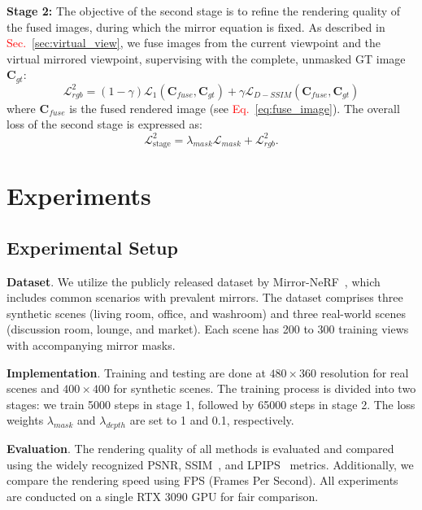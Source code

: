 \documentclass[conference]{IEEEtran}
\begin{document}
\textbf{Stage 2:} The objective of the second stage is to refine the rendering quality of the fused images, during which the mirror equation is fixed. As described in \textcolor{red}{Sec.~\ref{sec:virtual_view}}, we fuse images from the current viewpoint and the virtual mirrored viewpoint, supervising with the complete, unmasked GT image $\mathbf{C}_{gt}$: 
\begin{equation}
\label{eq:loss_rgb_2}
    \mathcal{L}_{rgb}^{2} = (1 \!- \!\gamma ) \mathcal{L}_1(\mathbf{C}_{fuse}, \mathbf{C}_{gt}) + \gamma\mathcal{L}_{D-SSIM}(\mathbf{C}_{fuse}, \mathbf{C}_{gt})
\end{equation}
where $\mathbf{C}_{fuse}$ is the fused rendered image (see \textcolor{red}{Eq.~\eqref{eq:fuse_image}}). The overall loss of the second stage is expressed as: 
\begin{equation}
    \mathcal{L}_{\text {stage}}^{2} = \lambda_{mask}\mathcal{L}_{mask} + \mathcal{L}_{rgb}^{2}.
\end{equation}



% 


\section{Experiments}
\label{sec:blind}

\subsection{Experimental Setup}

\noindent\textbf{Dataset}.
We utilize the publicly released dataset by Mirror-NeRF~\cite{zeng2023mirror}, which includes common scenarios with prevalent mirrors. The dataset comprises three synthetic scenes (living room, office, and washroom) and three real-world scenes (discussion room, lounge, and market). Each scene has 200 to 300 training views with accompanying mirror masks. 

\noindent\textbf{Implementation}. Training and testing are done at $480\times360$ resolution for real scenes and $400\times400$ for synthetic scenes. The training process is divided into two stages:  we train 5000 steps in stage 1, followed by 65000 steps in stage 2. The loss weights $\lambda_{mask}$ and $\lambda_{depth}$ are set to 1 and 0.1, respectively.

\noindent\textbf{Evaluation}. 
The rendering quality of all methods is evaluated and compared using the widely recognized PSNR,  SSIM~\cite{ssim}, and LPIPS~\cite{lpips} metrics.
Additionally, we compare the rendering speed using FPS (Frames Per Second). All experiments are conducted on a single RTX 3090 GPU for fair comparison. 
\end{document}
